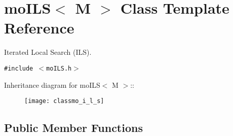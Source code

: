 \section{mo\-ILS$<$ M $>$ Class Template Reference}
\label{classmo_i_l_s}
Iterated Local Search (ILS).  


{\tt \#include $<$mo\-ILS.h$>$}

Inheritance diagram for mo\-ILS$<$ M $>$::\begin{figure}[H]
\begin{center}
\leavevmode
\texttt{[image: classmo\_i\_l\_s]}
\end{center}
\end{figure}
\subsection*{Public Member Functions}
